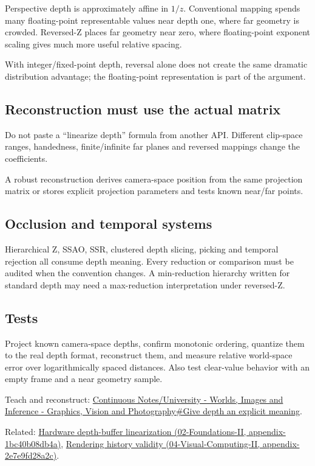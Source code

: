 Perspective depth is approximately affine in \(1/z\). Conventional mapping spends many floating-point representable values near depth one, where far geometry is crowded. Reversed-Z places far geometry near zero, where floating-point exponent scaling gives much more useful relative spacing.

With integer/fixed-point depth, reversal alone does not create the same dramatic distribution advantage; the floating-point representation is part of the argument.

\subsection{Reconstruction must use the actual matrix}\label{appendix-275ec8847057-reconstruction-must-use-the-actual-matrix}

Do not paste a ``linearize depth'' formula from another API. Different clip-space ranges, handedness, finite/infinite far planes and reversed mappings change the coefficients.

A robust reconstruction derives camera-space position from the same projection matrix or stores explicit projection parameters and tests known near/far points.

\subsection{Occlusion and temporal systems}\label{appendix-275ec8847057-occlusion-and-temporal-systems}

Hierarchical Z, SSAO, SSR, clustered depth slicing, picking and temporal rejection all consume depth meaning. Every reduction or comparison must be audited when the convention changes. A min-reduction hierarchy written for standard depth may need a max-reduction interpretation under reversed-Z.

\subsection{Tests}\label{appendix-275ec8847057-tests}

Project known camera-space depths, confirm monotonic ordering, quantize them to the real depth format, reconstruct them, and measure relative world-space error over logarithmically spaced distances. Also test clear-value behavior with an empty frame and a near geometry sample.

Teach and reconstruct: \hyperref[03-visual-computing-i-ch012-give-depth-an-explicit-meaning]{Continuous Notes/University - Worlds, Images and Inference - Graphics, Vision and Photography\#Give depth an explicit meaning}.

Related: \href{../02-Foundations-II/main.pdf\#nameddest=appendix-1bc40b08db4a}{Hardware depth-buffer linearization (02-Foundations-II, appendix-1bc40b08db4a)}, \href{../04-Visual-Computing-II/main.pdf\#nameddest=appendix-2e7e9fd28a2c}{Rendering history validity (04-Visual-Computing-II, appendix-2e7e9fd28a2c)}.
